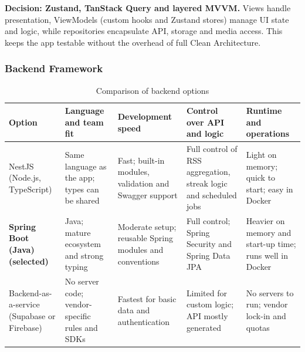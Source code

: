 \endgroup

\noindent\textbf{Decision: Zustand, TanStack Query and layered MVVM.} Views handle presentation, ViewModels (custom hooks and Zustand stores) manage UI state and logic, while repositories encapsulate API, storage and media access. This keeps the app testable without the overhead of full Clean Architecture.


\subsubsection{Backend Framework}

\begingroup

\footnotesize

\begin{longtable}{|>{\raggedright\arraybackslash}p{2.6cm}|>{\raggedright\arraybackslash}p{2.95cm}|>{\raggedright\arraybackslash}p{2.95cm}|>{\raggedright\arraybackslash}p{2.95cm}|>{\raggedright\arraybackslash}p{2.95cm}|}

\caption{Comparison of backend options}\label{tab:tech-backend}\\

\hline

\textbf{Option} & \textbf{Language and team fit} & \textbf{Development speed} & \textbf{Control over API and logic} & \textbf{Runtime and operations} \\ \hline

NestJS (Node.js, TypeScript) & Same language as the app; types can be shared &

Fast; built-in modules, validation and Swagger support &
Full control of RSS aggregation, streak logic and scheduled jobs &
Light on memory; quick to start; easy in Docker \\ \hline

\textbf{Spring Boot (Java) (selected)} & Java; mature ecosystem and strong typing &

Moderate setup; reusable Spring modules and conventions &

Full control; Spring Security and Spring Data JPA &

Heavier on memory and start-up time; runs well in Docker \\ \hline
Backend-as-a-service (Supabase or Firebase) & No server code; vendor-specific rules and SDKs &
Fastest for basic data and authentication &
Limited for custom logic; API mostly generated &
No servers to run; vendor lock-in and quotas \\ \hline
\end{longtable}
\endgroup

